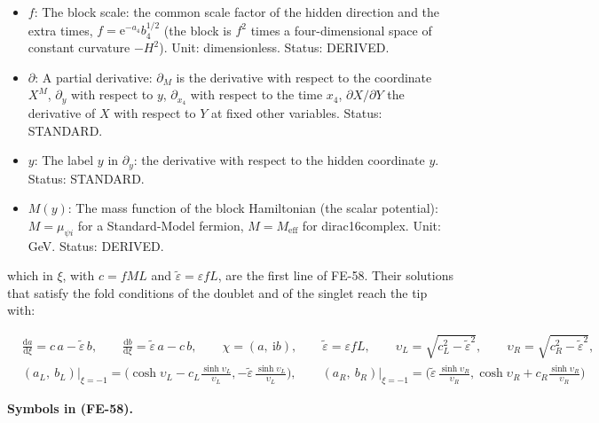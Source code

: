 \documentclass[
  10pt,
]{article}
\begin{document}
\begin{itemize}
  Unit: GeV. Status: DERIVED.
\item
  \(f\): The block scale: the common scale factor of the hidden
  direction and the extra times, \(f = \mathrm{e}^{-a_4}b_4^{1/2}\) (the
  block is \(f^2\) times a four-dimensional space of constant curvature
  \(-H^2\)). Unit: dimensionless. Status: DERIVED.
\item
  \(\partial\): A partial derivative: \(\partial_M\) is the derivative
  with respect to the coordinate \(X^M\), \(\partial_y\) with respect to
  \(y\), \(\partial_{x_4}\) with respect to the time \(x_4\),
  \(\partial X/\partial Y\) the derivative of \(X\) with respect to
  \(Y\) at fixed other variables. Status: STANDARD.
\item
  \(y\): The label \(y\) in \(\partial_y\): the derivative with respect
  to the hidden coordinate \(y\). Status: STANDARD.
\item
  \(M(y)\): The mass function of the block Hamiltonian (the scalar
  potential): \(M = \mu_{\psi i}\) for a Standard-Model fermion,
  \(M = M_{\mathrm{eff}}\) for dirac16complex. Unit: GeV. Status:
  DERIVED.
\end{itemize}

which in \(\xi\), with \(c = fML\) and
\(\tilde\varepsilon = \varepsilon fL\), are the first line of FE-58.
Their solutions that satisfy the fold conditions of the doublet and of
the singlet reach the tip with:

\[
\begin{aligned}
&\frac{\mathrm{d}a}{\mathrm{d}\xi} = c\,a - \tilde\varepsilon\,b,\qquad
 \frac{\mathrm{d}b}{\mathrm{d}\xi} = \tilde\varepsilon\,a - c\,b,
 \qquad \chi = (a,\ \mathrm{i}b),\qquad \tilde\varepsilon = \varepsilon fL,\qquad
 \upsilon_L = \sqrt{c_L^2 - \tilde\varepsilon^2},\qquad \upsilon_R = \sqrt{c_R^2 - \tilde\varepsilon^2},\\
&(a_L,\ b_L)\big\vert_{\xi=-1} = \Big(\cosh\upsilon_L - c_L\frac{\sinh\upsilon_L}{\upsilon_L},
 -\tilde\varepsilon\,\frac{\sinh\upsilon_L}{\upsilon_L}\Big),\qquad
 (a_R,\ b_R)\big\vert_{\xi=-1} = \Big(\tilde\varepsilon\,\frac{\sinh\upsilon_R}{\upsilon_R},
 \cosh\upsilon_R + c_R\frac{\sinh\upsilon_R}{\upsilon_R}\Big)
\end{aligned} \tag{FE-58}
\]

\textbf{Symbols in (FE-58).}
\end{document}
